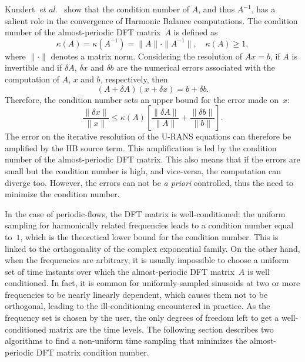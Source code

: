Kundert~\emph{et al.}~\cite{Kundert1988} show that the condition
number of $A$, and thus $A^{-1}$, has a salient role in the
convergence of Harmonic Balance computations. The condition number of
the almost-periodic DFT matrix~$A$ is defined as
\begin{equation}
   \kappa (A) = \kappa (A^{-1}) = \| A \| \cdot \| A^{-1} \|, \quad
   \kappa(A) \geq 1,
   \label{eq:condition_number}
\end{equation}
where $\| \cdot \|$ denotes a matrix norm.  Considering the resolution
of $A x = b$, if $A$ is invertible and if $\delta A$, $\delta x$ and
$\delta b$ are the numerical errors associated with the computation of
$A$, $x$ and $b$, respectively, then
\begin{equation}
   (A + \delta A)(x + \delta x) = b + \delta b.
   \label{eq:error_reso}
\end{equation}
Therefore, the condition number sets an upper bound for the error made on~$x$:
\begin{equation}
   \frac{\| \delta x \|}{\| x \|} \leq \kappa(A)\left[\frac{\| \delta A \|}{\| A \|} + \frac{\| \delta b \|}{\| b \|} \right].
   \label{eq:conditonnig_amp}
\end{equation}
The error on the iterative resolution of the U-RANS equations can
therefore be amplified by the HB source term. This amplification is
led by the condition number of the almost-periodic DFT matrix. This
also means that if the errors are small but the condition number is
high, and vice-versa, the computation can diverge too. However, the
errors can not be \emph{a priori} controlled, thus the need to
minimize the condition number.

In the case of periodic-flows, the DFT matrix is well-conditioned: the
uniform sampling for harmonically related frequencies leads to a
condition number equal to~$1$, which is the theoretical lower bound
for the condition number.  This is linked to the orthogonality of the
complex exponential family.  On the other hand, when the frequencies are arbitrary, it is usually
impossible to choose a uniform set of time instants over which the
almost-periodic DFT matrix~$A$ is well conditioned. In fact, it is common for uniformly-sampled
sinusoids at two or more frequencies to be nearly linearly dependent,
which causes them not to be orthogonal, leading to the
ill-conditioning encountered in practice. As the frequency set is
chosen by the user, the only degrees of freedom left to get a
well-conditioned matrix are the time levels.  The following section
describes two algorithms to find a non-uniform time sampling that
minimizes the almost-periodic DFT matrix condition number.

